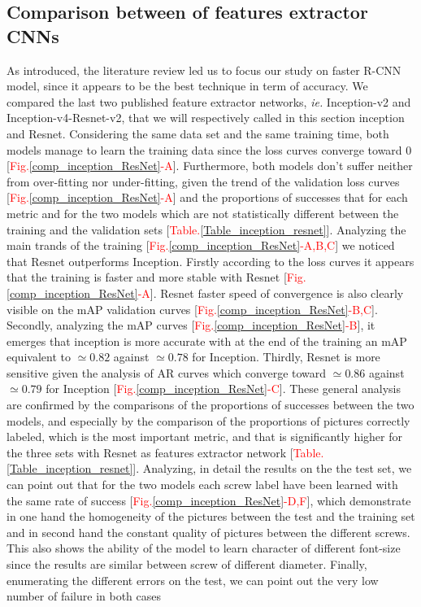 \documentclass[12pt, french, a4paper]{article} %
\begin{document}
\subsection{Comparison between of features extractor CNNs }
As introduced, the literature review led us to focus our study on faster \gls{R-CNN} model, since it appears to be the best technique in term of accuracy. We compared the last two published feature extractor networks, \textit{ie.} Inception-v2 and Inception-v4-Resnet-v2, that we will respectively called in this section inception and Resnet. Considering the same data set and the same training time, both models manage to learn the training data since the loss curves converge toward 0 [\textcolor{red}{Fig.}\ref{comp_inception_ResNet}\textcolor{red}{-A}]. Furthermore, both models don't suffer neither from over-fitting nor under-fitting, given the trend of the validation loss curves [\textcolor{red}{Fig.}\ref{comp_inception_ResNet}\textcolor{red}{-A}] and the proportions of successes that for each metric and for the two models which are not statistically different between the training and the validation sets [\textcolor{red}{Table.}\ref{Table_inception_resnet}]. Analyzing the main trands of the training [\textcolor{red}{Fig.}\ref{comp_inception_ResNet}\textcolor{red}{-A,B,C}] we noticed that Resnet outperforms Inception. Firstly according to the loss curves it appears that the training is faster and more stable with Resnet [\textcolor{red}{Fig.}\ref{comp_inception_ResNet}\textcolor{red}{-A}]. Resnet faster speed of convergence is also clearly visible on the \gls{mAP} validation curves [\textcolor{red}{Fig.}\ref{comp_inception_ResNet}\textcolor{red}{-B,C}]. Secondly, analyzing the mAP curves [\textcolor{red}{Fig.}\ref{comp_inception_ResNet}\textcolor{red}{-B}], it emerges that inception is more accurate with at the end of the training an \gls{mAP} equivalent to $\simeq 0.82$ against $\simeq 0.78$ for Inception. Thirdly, Resnet is more sensitive given the analysis of \gls{AR} curves which converge toward $\simeq 0.86$ against $\simeq 0.79$ for Inception [\textcolor{red}{Fig.}\ref{comp_inception_ResNet}\textcolor{red}{-C}]. These general analysis are confirmed by the comparisons of the proportions of successes between the two models, and especially by the comparison of the proportions of pictures correctly labeled, which is the most important metric, and that is significantly higher for the three sets with Resnet as features extractor network [\textcolor{red}{Table.}\ref{Table_inception_resnet}]. Analyzing, in detail the results on the the test set, we can point out that for the two models each screw label have been learned with the same rate of success [\textcolor{red}{Fig.}\ref{comp_inception_ResNet}\textcolor{red}{-D,F}], which demonstrate in one hand the homogeneity of the pictures between the test and the training set and in second hand the constant quality of pictures between the different screws. This also shows the ability of the model to learn character of different font-size since the results are similar between screw of different diameter. Finally, enumerating the different errors on the test, we can point out the very low number of failure in both cases 
\end{document}
